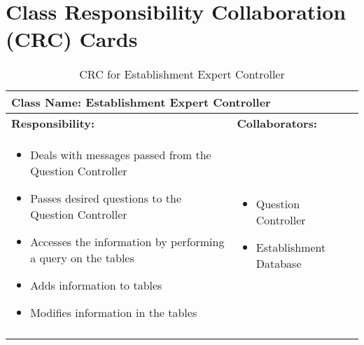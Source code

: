 \documentclass[titlepage]{article}
\begin{document}
	
\newpage	
\section{Class Responsibility Collaboration (CRC) Cards}
\label{sec:class_responsibility_collaboration_crc_cards}

	\begin{longtable}{| p{} | p{} |}
			\hline
			 \multicolumn{2}{|l|}{\textbf{Class Name: Establishment Expert Controller}} \\
			\hline
			\textbf{Responsibility:} & \textbf{Collaborators:} \\
			\hline
				\begin{itemize}
					\item Deals with messages passed from the Question Controller
					\item Passes desired questions to the Question Controller
					\item Accesses the information by performing a query on the tables
					\item Adds information to tables
					\item Modifies information in the tables
				\end{itemize} & 
				\begin{itemize}
					\item Question Controller
					\item Establishment Database
				\end{itemize} 
				\\
			\hline
		\caption{CRC for Establishment Expert Controller}
	\end{longtable}
	
\end{document}
